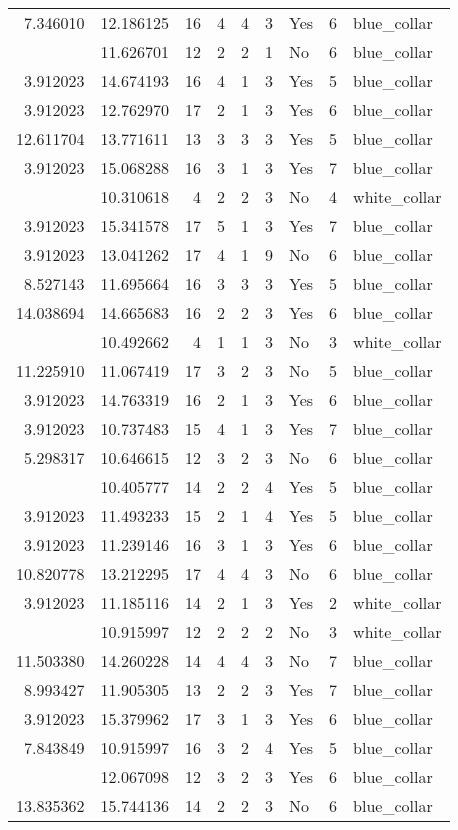 \documentclass[
]{article}
\begin{document}
\begin{longtable}[t]{rrrrrllrl}
7.346010 & 12.186125 & 16 & 4 & 4 & 3 & Yes & 6 & blue\_collar\\
\addlinespace
11.290407 & 11.626701 & 12 & 2 & 2 & 1 & No & 6 & blue\_collar\\
3.912023 & 14.674193 & 16 & 4 & 1 & 3 & Yes & 5 & blue\_collar\\
3.912023 & 12.762970 & 17 & 2 & 1 & 3 & Yes & 6 & blue\_collar\\
12.611704 & 13.771611 & 13 & 3 & 3 & 3 & Yes & 5 & blue\_collar\\
3.912023 & 15.068288 & 16 & 3 & 1 & 3 & Yes & 7 & blue\_collar\\
\addlinespace
6.956545 & 10.310618 & 4 & 2 & 2 & 3 & No & 4 & white\_collar\\
3.912023 & 15.341578 & 17 & 5 & 1 & 3 & Yes & 7 & blue\_collar\\
3.912023 & 13.041262 & 17 & 4 & 1 & 9 & No & 6 & blue\_collar\\
8.527143 & 11.695664 & 16 & 3 & 3 & 3 & Yes & 5 & blue\_collar\\
14.038694 & 14.665683 & 16 & 2 & 2 & 3 & Yes & 6 & blue\_collar\\
\addlinespace
3.912023 & 10.492662 & 4 & 1 & 1 & 3 & No & 3 & white\_collar\\
11.225910 & 11.067419 & 17 & 3 & 2 & 3 & No & 5 & blue\_collar\\
3.912023 & 14.763319 & 16 & 2 & 1 & 3 & Yes & 6 & blue\_collar\\
3.912023 & 10.737483 & 15 & 4 & 1 & 3 & Yes & 7 & blue\_collar\\
5.298317 & 10.646615 & 12 & 3 & 2 & 3 & No & 6 & blue\_collar\\
\addlinespace
6.109248 & 10.405777 & 14 & 2 & 2 & 4 & Yes & 5 & blue\_collar\\
3.912023 & 11.493233 & 15 & 2 & 1 & 4 & Yes & 5 & blue\_collar\\
3.912023 & 11.239146 & 16 & 3 & 1 & 3 & Yes & 6 & blue\_collar\\
10.820778 & 13.212295 & 17 & 4 & 4 & 3 & No & 6 & blue\_collar\\
3.912023 & 11.185116 & 14 & 2 & 1 & 3 & Yes & 2 & white\_collar\\
\addlinespace
5.521461 & 10.915997 & 12 & 2 & 2 & 2 & No & 3 & white\_collar\\
11.503380 & 14.260228 & 14 & 4 & 4 & 3 & No & 7 & blue\_collar\\
8.993427 & 11.905305 & 13 & 2 & 2 & 3 & Yes & 7 & blue\_collar\\
3.912023 & 15.379962 & 17 & 3 & 1 & 3 & Yes & 6 & blue\_collar\\
7.843849 & 10.915997 & 16 & 3 & 2 & 4 & Yes & 5 & blue\_collar\\
\addlinespace
7.130899 & 12.067098 & 12 & 3 & 2 & 3 & Yes & 6 & blue\_collar\\
13.835362 & 15.744136 & 14 & 2 & 2 & 3 & No & 6 & blue\_collar\\
\bottomrule
\end{longtable}
\end{document}
